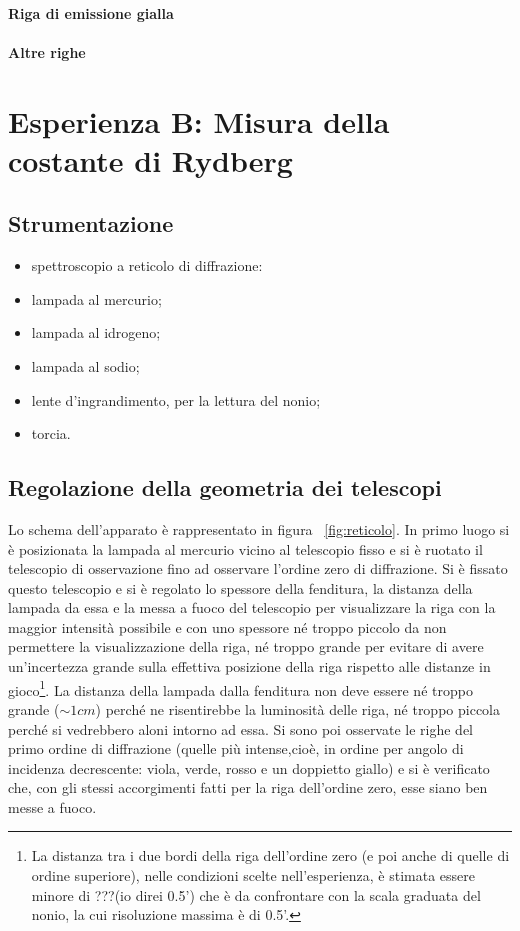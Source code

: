 \documentclass[a4paper,10pt]{article}
\begin{document}
\paragraph{Riga di emissione gialla}

\paragraph{Altre righe}

\section{Esperienza B: Misura della costante di Rydberg}

\subsection{Strumentazione}

\begin{itemize}
	\item spettroscopio a reticolo di diffrazione:

	\item lampada al mercurio;
	\item lampada al idrogeno;
	\item lampada al sodio;
	\item lente d'ingrandimento, per la lettura del nonio;
	\item torcia.
\end{itemize}


\subsection{Regolazione della geometria dei telescopi}
Lo schema dell'apparato è rappresentato in figura \figurename{~\ref{fig:reticolo}}.
In primo luogo si è posizionata la lampada al mercurio vicino al telescopio fisso e si è ruotato il telescopio di osservazione fino ad osservare l'ordine zero di diffrazione. Si è fissato questo telescopio e si è regolato lo spessore della fenditura, la distanza della lampada da essa e la messa a fuoco del telescopio per visualizzare la riga con la maggior intensità possibile e con uno spessore né troppo piccolo da non permettere la visualizzazione della riga, né troppo grande per evitare di avere un'incertezza grande sulla effettiva posizione della riga rispetto alle distanze in gioco\footnote{La distanza tra i due bordi della riga dell'ordine zero (e poi anche di quelle di ordine superiore), nelle condizioni scelte nell'esperienza, è stimata essere minore di ???(io direi 0.5') che è da confrontare con la scala graduata del nonio, la cui risoluzione massima è di 0.5'.}.
La distanza della lampada dalla fenditura non deve essere né troppo grande ($\sim 1 cm$) perché ne risentirebbe la luminosità delle riga, né troppo piccola perché si vedrebbero aloni intorno ad essa.
Si sono poi osservate le righe del primo ordine di diffrazione (quelle più intense,cioè, in ordine per angolo di incidenza decrescente: viola, verde, rosso e un doppietto giallo) e si è verificato che, con gli stessi accorgimenti fatti per la riga dell'ordine zero, esse siano ben messe a fuoco.
\end{document}
